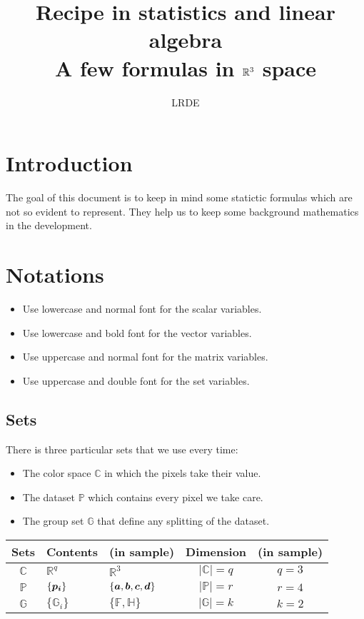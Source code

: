 \documentclass{article}
\title{Recipe in statistics and linear algebra\\
  \large{A few formulas in $\fm{R}^3$ space} }
\author{LRDE}
\date{}
\newcommand{\bm}[1]{\mbox{\boldmath$#1$}}
\newcommand{\fm}[1]{\mathbb{#1}}
\newcommand{\df}[1]{|{\mathbb{#1}}|}
\begin{document}
\maketitle

\section{Introduction}
The goal of this document is to keep in mind some statictic formulas which are
not so evident to represent. They help us to keep some background mathematics
in the development.

\section{Notations}

\begin{itemize}
  \item Use lowercase and normal font for the scalar variables.
  \item Use lowercase and bold font for the vector variables.
  \item Use uppercase and normal font for the matrix variables.
  \item Use uppercase and double font for the set variables.
\end {itemize}

\subsection{Sets}

There is three particular sets that we use every time:
\begin{itemize}
  \item The color space $\fm{C}$ in which the pixels take their value.
  \item The dataset $\fm{P}$ which contains every pixel we take care.
  \item The group set $\fm{G}$ that define any splitting of the dataset.
\end{itemize}

\begin{tabular}{|c|l|l|c|c|}
  \hline
  Sets      & Contents          & (in sample) &
  Dimension & (in sample)  \\
  \hline
  $\fm{C}$     & $\fm{R}^q$     & $\fm{R}^3$  &
  $\df{C} = q$ & $q = 3$ \\
  $\fm{P}$     & $\{\bm{p_i}\}$ &$\{\bm{a},\bm{b},\bm{c},\bm{d}\}$ & 
  $\df{P} = r$ & $r = 4$ \\
  $\fm{G}$     & $\{\fm{G}_i\}$ &$\{\fm{F}, \fm{H}\}$ &
  $\df{G} = k$ & $k = 2$ \\
  \hline
\end{tabular}
\end{document}
